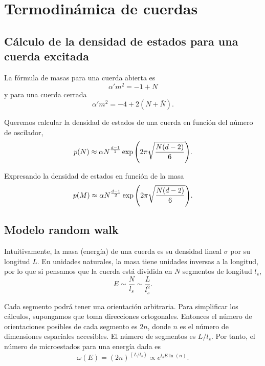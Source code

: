 \chapter{Termodinámica de cuerdas}

\section{Cálculo de la densidad de estados para una cuerda excitada}

La fórmula de masas para una cuerda abierta es
\begin{equation}
  \alpha' m^2=-1+N
\end{equation}
y para una cuerda cerrada
\begin{equation}
  \alpha' m^2=-4+2(N+\bar N).
\end{equation}

Queremos calcular la densidad de estados de una cuerda en función del número de 
oscilador, 
\begin{equation}
  p(N)\approx \alpha N^ {\frac{d-1}{2}}\exp\qty(2\pi\sqrt{\frac{N(d-2)}{6}}).
\end{equation}

Expresando la densidad de estados en función de la masa
\begin{equation}
  p(M)\approx \alpha N^ {\frac{d-1}{2}}\exp\qty(2\pi\sqrt{\frac{N(d-2)}{6}}).
\end{equation}

\section{Modelo random walk}

Intuitivamente, la masa (energía) de una cuerda es su densidad lineal $\sigma$ por su longitud $L$.
En unidades naturales, la masa tiene unidades inversas a la longitud, por lo que si pensamos
que la cuerda está dividida en $N$ segmentos de longitud $l_s$, 
\begin{equation}
  E\sim  \frac{N}{l_s} \sim \frac{L}{l_s^2}.
\end{equation}

Cada segmento podrá tener una orientación arbitraria. Para simplificar los cálculos,
supongamos que toma direcciones ortogonales. Entonces el número de orientaciones posibles
de cada segmento es $2n$, donde $n$ es el número de dimensiones espaciales accesibles.
El número de segmentos es $L/l_s$.
Por tanto, el número de microestados para una energía dada es
\begin{equation}
  \omega(E)=(2n)^{(L/l_s)}\propto e^{l_s E \ln (n)}.
\end{equation}

